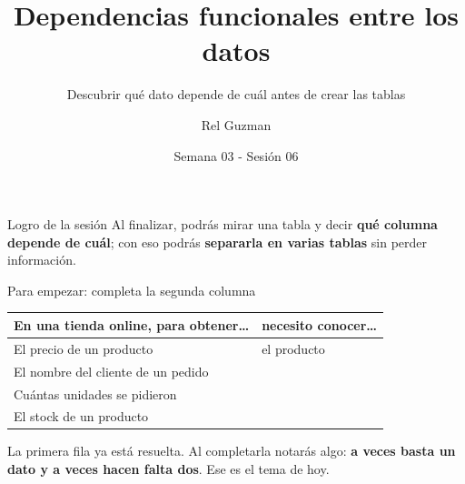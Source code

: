 \documentclass[aspectratio=169,10pt,c]{beamer}
\title{Dependencias funcionales entre los datos}
\subtitle{Descubrir qué dato depende de cuál antes de crear las tablas}
\date{Semana 03 - Sesión 06}
\author{Rel Guzman}
\newcommand{\bl}[1][1.9cm]{\underline{\hspace{#1}}}
\begin{document}
{\maketitle}

\begin{frame}[c]
\begin{block}{Logro de la sesión}
Al finalizar, podrás mirar una tabla y decir \textbf{qué columna depende de cuál}; con eso podrás \textbf{separarla en varias tablas} sin perder información.
\end{block}
\end{frame}

\begin{frame}{Para empezar: completa la segunda columna}
\begin{center}
\small
\begin{tabular}{p{6.2cm}p{5.2cm}}
\toprule
\bfseries En una tienda online, para obtener\ldots & \bfseries necesito conocer\ldots \\
\midrule
El precio de un producto & el producto \\[4pt]
El nombre del cliente de un pedido & \bl[3.6cm] \\[4pt]
Cuántas unidades se pidieron & \bl[3.6cm] \\[4pt]
El stock de un producto & \bl[3.6cm] \\
\bottomrule
\end{tabular}
\end{center}
\vspace{0.35cm}
\small La primera fila ya está resuelta. Al completarla notarás algo: \textbf{a veces basta un dato y a veces hacen falta dos}. Ese es el tema de hoy.
\end{frame}
\end{document}
